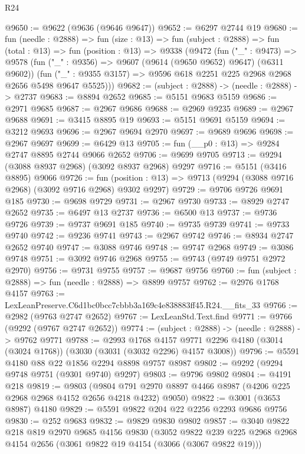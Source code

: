 \begin{lexlean}{R24}
\begin{coremodule}
@9650 := @9622 (@9636 (@9646 @9647))
@9652 := @6297 @2744 @19
@9680 := fun (needle : @2888) =>
  fun (size : @13) =>
  fun (subject : @2888) =>
  fun (total : @13) =>
  fun (position : @13) =>
  @9338
    (@9472
      (fun ("_" : @9473) =>
      @9578
        (fun ("_" : @9356) => @9607 (@9614 (@9650 @9652) @9647) (@6311 @9602))
        (fun ("_" : @9355 @3157) => @9596 @618 @2251 @225 @2968 @2968 @2656 @5498 @9647 @5525)))
@9682 := (subject : @2888) -> (needle : @2888) -> @2737
@9683 := @8894 @2652
@9685 := @5151 @9683 @5159
@9686 := @2971 @9685
@9687 := @2967 @9686
@9688 := @2969 @9235
@9689 := @2967 @9688
@9691 := @3415 @8895 @19
@9693 := @5151 @9691 @5159
@9694 := @3212 @9693
@9696 := @2967 @9694 @2970
@9697 := @9689 @9696
@9698 := @2967 @9697
@9699 := @6429 @13
@9705 := fun (__p0 : @13) => @9284 @2747 @8895 @2744 @9066 @2652
@9706 := @9699 @9705
@9713 := @9294 (@3088 @8937 @2968) (@3092 @8937 @2968) @9297
@9716 := @5151 (@3416 @8895) @9066
@9726 := fun (position : @13) => @9713 (@9294 (@3088 @9716 @2968) (@3092 @9716 @2968) @9302 @9297)
@9729 := @9706 @9726 @9691 @185
@9730 := @9698 @9729
@9731 := @2967 @9730
@9733 := @8929 @2747 @2652
@9735 := @6497 @13 @2737
@9736 := @6500 @13
@9737 := @9736 @9726
@9739 := @9737 @9691 @185
@9740 := @9735 @9739
@9741 := @9733 @9740
@9742 := @9236 @9741
@9743 := @2967 @9742
@9746 := @8934 @2747 @2652 @9740
@9747 := @3088 @9746
@9748 := @9747 @2968
@9749 := @3086 @9748
@9751 := @3092 @9746 @2968
@9755 := @9743 (@9749 @9751 @2972 @2970)
@9756 := @9731 @9755
@9757 := @9687 @9756
@9760 := fun (subject : @2888) => fun (needle : @2888) => @8899 @9757
@9762 := @2976 @1768 @4157
@9763 := LexLeanPreserve.C6d1bc0bcc7cbbb3a169c4e838883ff45.R24.__fits_33
@9766 := @2982 (@9763 @2747 @2652)
@9767 := LexLeanStd.Text.find
@9771 := @9766 (@9292 (@9767 @2747 @2652))
@9774 := (subject : @2888) -> (needle : @2888) -> @9762 @9771
@9788 := @2993
    @1768
    @4157
    @9771
    @2296
    @4180
    (@3014 (@3024 @1768))
    (@3030 (@3031 (@3032 @2296) @4157 @3008))
@9796 := @5591 @4180 @88 @22 @1856 @2294 @8898 @9757 @8987
@9802 := @9292 (@9294 @9748 @9751 (@9301 @9740) @9297)
@9803 := @9796 @9802
@9804 := @4191 @218
@9819 := @9803
    (@9804 @791 @2970 @8897 @4466 @8987 (@4206 @225 @2968 @2968 @4152 @2656 @4218 @4232) @9050)
@9822 := @3001 (@3653 @8987) @4180
@9829 := @5591 @9822 @204 @22 @2256 @2293 @9686 @9756
@9830 := @252 @9683
@9832 := @9829 @9830 @9802
@9857 := @3040
    @9822
    @218
    @819
    @2970
    @9685
    @4156
    @9830
    (@3052
      @9822
      @239
      @225
      @2968
      @2968
      @4154
      @2656
      (@3061 @9822 @19 @4154 (@3066 (@3067 @9822 @19)))

\end{coremodule}
\end{lexlean}
